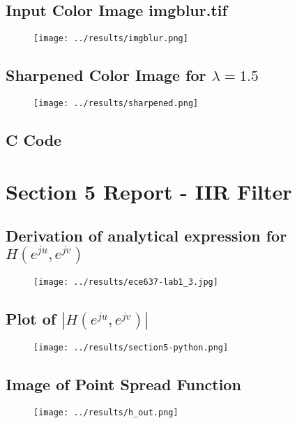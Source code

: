 \documentclass{article}
\begin{document}
\subsection{Input Color Image imgblur.tif}
\begin{figure}[H]
    \centering
    \texttt{[image: ../results/imgblur.png]}
    \begin{center}
    \end{center}
\end{figure}
\subsection{Sharpened Color Image for $\lambda = 1.5$}
\begin{figure}[H]
    \centering
    \texttt{[image: ../results/sharpened.png]}
    \begin{center}
    \end{center}
\end{figure}
\subsection{C Code}


\section{Section 5 Report - IIR Filter}
\subsection{Derivation of analytical expression for $H(e^{ju}, e^{jv})$}
\begin{figure}[H]
    \centering
    \texttt{[image: ../results/ece637-lab1\_3.jpg]}
    \begin{center}
    \end{center}
\end{figure}
\subsection{Plot of $|H(e^{ju}, e^{jv})|$}
\begin{figure}[H]
    \centering
    \texttt{[image: ../results/section5-python.png]}
    \begin{center}
    \end{center}
\end{figure}
\subsection{Image of Point Spread Function}
\begin{figure}[H]
    \centering
    \texttt{[image: ../results/h\_out.png]}
    \begin{center}
    \end{center}
\end{figure}
\end{document}
